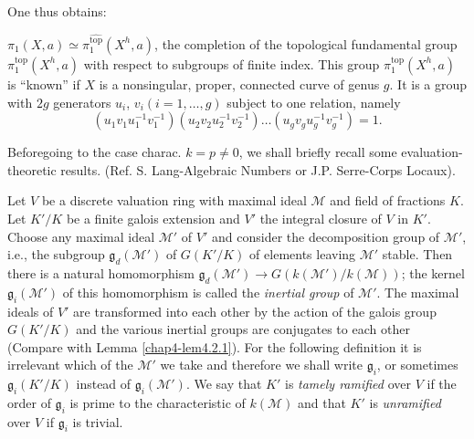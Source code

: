 One thus obtains:

$\pi_{1}(X,a)\simeq \pi_{1}^{\widehat{\text{top}}}(X^{h},a)$, the
completion of the topological fundamental group
$\pi_{1}^{\text{top}}(X^{h},a)$ with respect to subgroups of finite
index. This group $\pi^{\text{top}}_{1}(X^{h},a)$ is ``known'' if $X$ is a
nonsingular, proper, connected curve of genus $g$. It is a group with
$2g$ generators $u_{i}$, $v_{i}(i=1,\ldots,g)$ subject to one
relation, namely 
$$
(u_{1}v_{1}u^{-1}_{1}v^{-1}_{1})(u_{2}v_{2}u^{-1}_{2}v^{-1}_{2})\ldots
(u_{g}v_{g}u^{-1}_{g}v^{-1}_{g})=1. 
$$

Before\pageoriginale going to the case charac. $k=p\neq 0$, we shall
briefly recall some evaluation-theoretic
results. (Ref. S. Lang-Algebraic Numbers or J.P. Serre-Corps Locaux).

Let $V$ be a discrete valuation ring with maximal ideal $\mathscr{M}$
and field of fractions $K$. Let $K'/K$ be a finite galois extension
and $V'$ the integral closure of $V$ in $K'$. Choose any maximal ideal
$\mathscr{M}'$ of $V'$ and consider the decomposition group of
$\mathscr{M}'$, i.e., the subgroup $\mathfrak{g}_{d}(\mathscr{M}')$ of
$G(K'/K)$ of elements leaving $\mathscr{M}'$ stable. Then there is a
natural homomorphism
$\mathfrak{g}_{d}(\mathscr{M}')\to
G(k(\mathscr{M}')/k(\mathscr{M}))$; the kernel
$\mathfrak{g}_{i}(\mathscr{M}')$ of this homomorphism is called the
{\em inertial group} of $\mathscr{M}'$. The maximal ideals of $V'$ are
transformed into each other by the action of the galois group $G(K'/K)$
and the various inertial groups are conjugates to each other (Compare with
Lemma \ref{chap4-lem4.2.1}). For the following definition it is irrelevant
which of the $\mathscr{M}'$ we take and therefore we shall write
$\mathfrak{g}_{i}$, or sometimes $\mathfrak{g}_{i}(K'/K)$ instead of
$\mathfrak{g}_{i}(\mathscr{M}')$. We say that $K'$ is {\em tamely
ramified} over $V$ if the order of $\mathfrak{g}_{i}$ is prime to the
characteristic of $k(\mathscr{M})$ and that $K'$ is {\em unramified}
over $V$ if $\mathfrak{g}_{i}$ is trivial.


